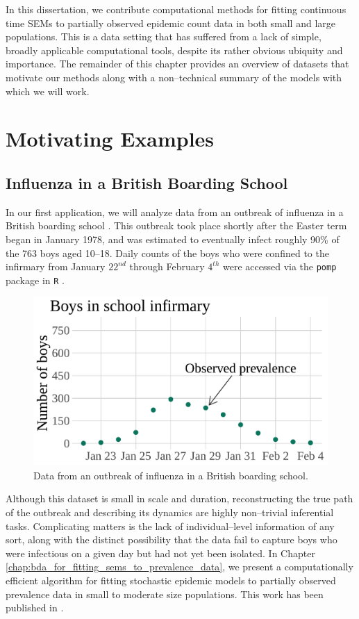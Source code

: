 In this dissertation, we contribute computational methods for fitting continuous time SEMs to partially observed epidemic count data in both small and large populations. This is a data setting that has suffered from a lack of simple, broadly applicable computational tools, despite its rather obvious ubiquity and importance. The remainder of this chapter provides an overview of datasets that motivate our methods along with a non--technical summary of the models with which we will work. 

\section{Motivating Examples}
\label{sec:motivating_examples}
 
\subsection{Influenza in a British Boarding School}
\label{subsec:bbs_descrip}

In our first application, we will analyze data from an outbreak of influenza in a British boarding school \citep{anon1978, davies1982}. This outbreak took place shortly after the Easter term began in January 1978, and was estimated to eventually infect roughly 90\% of the 763 boys aged 10--18. Daily counts of the boys who were confined to the infirmary from January $22^{nd}$ through February $4^{th}$ were accessed via the \texttt{pomp} package in \texttt{R} \citep{pomp}.

\begin{figure}[htbp]
	\centering
	\includegraphics[width=0.6\linewidth]{figures/bbs_data}
	\caption{Data from an outbreak of influenza in a British boarding school.}
	\label{fig:bbsdata}
\end{figure}

Although this dataset is small in scale and duration, reconstructing the true path of the outbreak and describing its dynamics are highly non--trivial inferential tasks. Complicating matters is the lack of individual--level information of any sort, along with the distinct possibility that the data fail to capture boys who were infectious on a given day but had not yet been isolated. In Chapter  \ref{chap:bda_for_fitting_sems_to_prevalence_data}, we present a computationally efficient algorithm for fitting stochastic epidemic models to partially observed prevalence data in small to moderate size populations. This work has been published in \cite{fintzi2017efficient}. 

